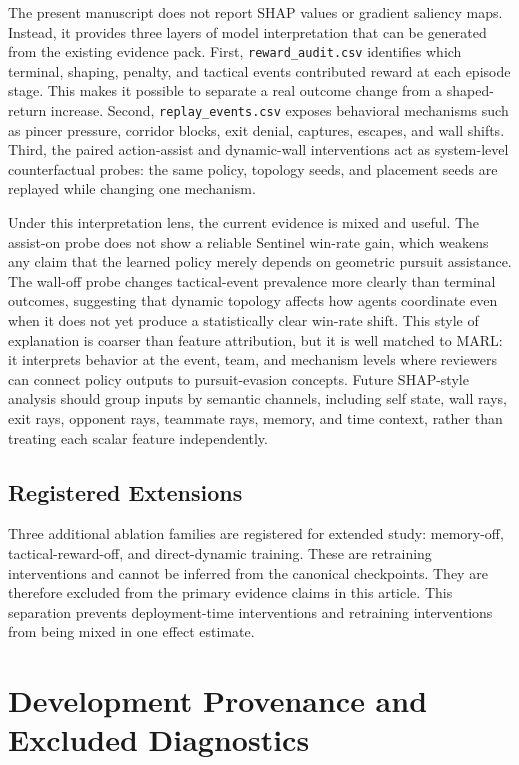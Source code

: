 \documentclass[journal]{IEEEtran}
\begin{document}
The present manuscript does not report SHAP values or gradient saliency maps.
Instead, it provides three layers of model interpretation that can be generated
from the existing evidence pack. First, \texttt{reward\_audit.csv} identifies
which terminal, shaping, penalty, and tactical events contributed reward at
each episode stage. This makes it possible to separate a real outcome change
from a shaped-return increase. Second, \texttt{replay\_events.csv} exposes
behavioral mechanisms such as pincer pressure, corridor blocks, exit denial,
captures, escapes, and wall shifts. Third, the paired action-assist and
dynamic-wall interventions act as system-level counterfactual probes: the same
policy, topology seeds, and placement seeds are replayed while changing one
mechanism.

Under this interpretation lens, the current evidence is mixed and useful. The
assist-on probe does not show a reliable Sentinel win-rate gain, which weakens
any claim that the learned policy merely depends on geometric pursuit
assistance. The wall-off probe changes tactical-event prevalence more clearly
than terminal outcomes, suggesting that dynamic topology affects how agents
coordinate even when it does not yet produce a statistically clear win-rate
shift. This style of explanation is coarser than feature attribution, but it is
well matched to MARL: it interprets behavior at the event, team, and mechanism
levels where reviewers can connect policy outputs to pursuit-evasion concepts.
Future SHAP-style analysis should group inputs by semantic channels, including
self state, wall rays, exit rays, opponent rays, teammate rays, memory, and time
context, rather than treating each scalar feature independently.

\subsection{Registered Extensions}

Three additional ablation families are registered for extended study:
memory-off, tactical-reward-off, and direct-dynamic training. These are
retraining interventions and cannot be inferred from the canonical checkpoints.
They are therefore excluded from the primary evidence claims in this article.
This separation prevents deployment-time interventions and retraining
interventions from being mixed in one effect estimate.

\section{Development Provenance and Excluded Diagnostics}
\end{document}
